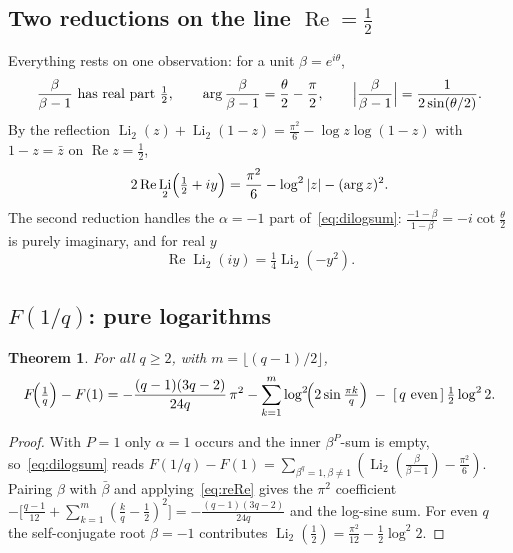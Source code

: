 \documentclass[11pt]{article}
\DeclareMathOperator{\Li}{Li}
\DeclareMathOperator{\Real}{Re}
\theoremstyle{plain}\newtheorem{theorem}{Theorem}\newtheorem{proposition}[theorem]{Proposition}
\theoremstyle{remark}\newtheorem{remark}[theorem]{Remark}
\begin{document}
\subsection{Two reductions on the line \texorpdfstring{$\Real=\tfrac12$}{Re=1/2}}
Everything rests on one observation: for a unit $\beta=e^{i\theta}$,
\begin{equation}\label{eq:line}
  \frac{\beta}{\beta-1}\ \text{has real part}\ \tfrac12,\qquad
  \arg\frac{\beta}{\beta-1}=\frac{\theta}{2}-\frac{\pi}{2},\qquad
  \Bigl|\frac{\beta}{\beta-1}\Bigr|=\frac{1}{2\sin(\theta/2)} .
\end{equation}
By the reflection $\Li_2(z)+\Li_2(1-z)=\tfrac{\pi^2}{6}-\log z\log(1-z)$ with $1-z=\bar z$ on $\Real z=\tfrac12$,
\begin{equation}\label{eq:reRe}
  2\Real\Li_2\Bigl(\tfrac12+iy\Bigr)=\frac{\pi^2}{6}-\log^2|z|-(\arg z)^2 .
\end{equation}
The second reduction handles the $\alpha=-1$ part of~\eqref{eq:dilogsum}: $\tfrac{-1-\beta}{1-\beta}=-i\cot\tfrac\theta2$
is purely imaginary, and for real $y$
\begin{equation}\label{eq:imax}
  \Real\Li_2(iy)=\tfrac14\Li_2(-y^2).
\end{equation}

\subsection{$F(1/q)$: pure logarithms}
\begin{theorem}\label{thm:F1q}
For all $q\ge2$, with $m=\lfloor(q-1)/2\rfloor$,
\[
  F\!\Bigl(\tfrac1q\Bigr)-F(1)=-\frac{(q-1)(3q-2)}{24q}\,\pi^2
  -\sum_{k=1}^{m}\log^2\!\Bigl(2\sin\tfrac{\pi k}{q}\Bigr)\;-\;[\,q\ \mathrm{even}\,]\,\tfrac12\log^2 2 .
\]
\end{theorem}
\begin{proof}
With $P=1$ only $\alpha=1$ occurs and the inner $\beta^P$-sum is empty, so~\eqref{eq:dilogsum} reads
$F(1/q)-F(1)=\sum_{\beta^q=1,\beta\neq1}(\Li_2(\tfrac{\beta}{\beta-1})-\tfrac{\pi^2}{6})$. Pairing $\beta$ with
$\bar\beta$ and applying~\eqref{eq:reRe} gives the $\pi^2$ coefficient
$-\bigl[\tfrac{q-1}{12}+\sum_{k=1}^m(\tfrac kq-\tfrac12)^2\bigr]=-\tfrac{(q-1)(3q-2)}{24q}$ and the log-sine sum.
For even $q$ the self-conjugate root $\beta=-1$ contributes $\Li_2(\tfrac12)=\tfrac{\pi^2}{12}-\tfrac12\log^2 2$.
\end{proof}
\end{document}
